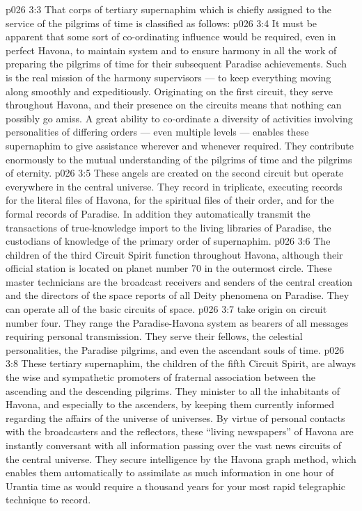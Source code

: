 \vs p026 3:3 \pc That corps of tertiary supernaphim which is chiefly assigned to the service of the pilgrims of time is classified as follows:
\vs p026 3:4 \bibnobreakspace {} It must be apparent that some sort of co\hyp{}ordinating influence would be required, even in perfect Havona, to maintain system and to ensure harmony in all the work of preparing the pilgrims of time for their subsequent Paradise achievements. Such is the real mission of the harmony supervisors --- to keep everything moving along smoothly and expeditiously. Originating on the first circuit, they serve throughout Havona, and their presence on the circuits means that nothing can possibly go amiss. A great ability to co\hyp{}ordinate a diversity of activities involving personalities of differing orders --- even multiple levels --- enables these supernaphim to give assistance wherever and whenever required. They contribute enormously to the mutual understanding of the pilgrims of time and the pilgrims of eternity.
\vs p026 3:5 \bibnobreakspace {} These angels are created on the second circuit but operate everywhere in the central universe. They record in triplicate, executing records for the literal files of Havona, for the spiritual files of their order, and for the formal records of Paradise. In addition they automatically transmit the transactions of true\hyp{}knowledge import to the living libraries of Paradise, the custodians of knowledge of the primary order of supernaphim.
\vs p026 3:6 \bibnobreakspace {} The children of the third Circuit Spirit function throughout Havona, although their official station is located on planet number 70 in the outermost circle. These master technicians are the broadcast receivers and senders of the central creation and the directors of the space reports of all Deity phenomena on Paradise. They can operate all of the basic circuits of space.
\vs p026 3:7 \bibnobreakspace {} take origin on circuit number four. They range the Paradise\hyp{}Havona system as bearers of all messages requiring personal transmission. They serve their fellows, the celestial personalities, the Paradise pilgrims, and even the ascendant souls of time.
\vs p026 3:8 \bibnobreakspace {} These tertiary supernaphim, the children of the fifth Circuit Spirit, are always the wise and sympathetic promoters of fraternal association between the ascending and the descending pilgrims. They minister to all the inhabitants of Havona, and especially to the ascenders, by keeping them currently informed regarding the affairs of the universe of universes. By virtue of personal contacts with the broadcasters and the reflectors, these “living newspapers” of Havona are instantly conversant with all information passing over the vast news circuits of the central universe. They secure intelligence by the Havona graph method, which enables them automatically to assimilate as much information in one hour of Urantia time as would require a thousand years for your most rapid telegraphic technique to record.
